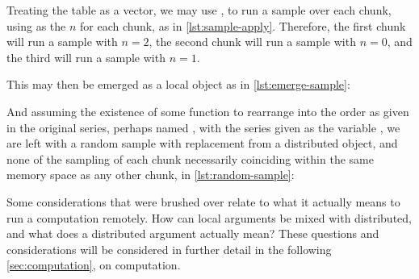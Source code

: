 
Treating the table as a vector, we may use , to run a sample over each chunk, using  as the \(n\) for each chunk, as in \cref{lst:sample-apply}.
Therefore, the first chunk will run a sample with \(n=2\), the second chunk will run a sample with \(n=0\), and the third will run a sample with \(n=1\).


This may then be emerged as a local object as in \cref{lst:emerge-sample}:


And assuming the existence of some function to rearrange into the order as given in the original series, perhaps named , with the series given as the variable , we are left with a random sample with replacement from a distributed object, and none of the sampling of each chunk necessarily coinciding within the same memory space as any other chunk, in \cref{lst:random-sample}:


Some considerations that were brushed over relate to what it actually means to run a computation remotely.
How can local arguments be mixed with distributed, and what does a distributed argument actually mean?
These questions and considerations will be considered in further detail in the following \cref{sec:computation}, on computation.
